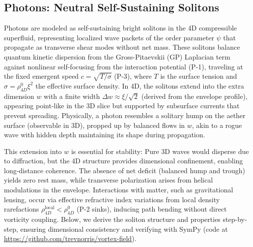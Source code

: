 \subsection{Photons: Neutral Self-Sustaining Solitons}

Photons are modeled as self-sustaining bright solitons in the 4D compressible superfluid, representing localized wave packets of the order parameter $\psi$ that propagate as transverse shear modes without net mass. These solitons balance quantum kinetic dispersion from the Gross-Pitaevskii (GP) Laplacian term against nonlinear self-focusing from the interaction potential (P-1), traveling at the fixed emergent speed $c = \sqrt{T / \sigma}$ (P-3), where $T$ is the surface tension and $\sigma = \rho_{4D}^0 \xi^2$ the effective surface density. In 4D, the solitons extend into the extra dimension $w$ with a finite width $\Delta w \approx \xi / \sqrt{2}$ (derived from the envelope profile), appearing point-like in the 3D slice but supported by subsurface currents that prevent spreading. Physically, a photon resembles a solitary hump on the aether surface (observable in 3D), propped up by balanced flows in $w$, akin to a rogue wave with hidden depth maintaining its shape during propagation.

This extension into $w$ is essential for stability: Pure 3D waves would disperse due to diffraction, but the 4D structure provides dimensional confinement, enabling long-distance coherence. The absence of net deficit (balanced hump and trough) yields zero rest mass, while transverse polarization arises from helical modulations in the envelope. Interactions with matter, such as gravitational lensing, occur via effective refractive index variations from local density rarefactions $\rho_{4D}^{\text{local}} < \rho_{4D}^0$ (P-2 sinks), inducing path bending without direct vorticity coupling. Below, we derive the soliton structure and properties step-by-step, ensuring dimensional consistency and verifying with SymPy (code at \url{https://github.com/trevnorris/vortex-field}).


